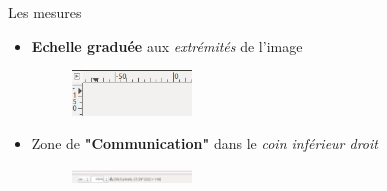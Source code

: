 \documentclass[10pt,svgnames,usenames,table]{beamer}
\begin{document}
\begin{frame}[allowframebreaks]{Les mesures}
\begin{itemize}
	\item \textbf{Echelle graduée} aux \textit{extrémités} de l'image

	\begin{figure}
	    	\centering
	    	\includegraphics[width=0.3\textwidth]{Images/Scale.png} 
	    \end{figure}

	\vspace{0.3cm}

	\item Zone de \textbf{"Communication"} dans le \textit{coin inférieur droit}

	\begin{figure}
	    	\centering
	    	\includegraphics[width=0.3\textwidth]{Images/commu.png} 
	\end{figure}


\end{itemize}
\end{frame}
\end{document}
